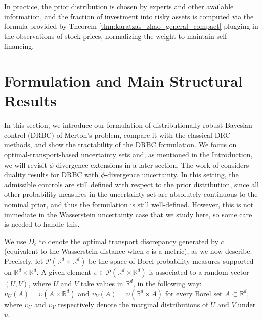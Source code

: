 \documentclass[11pt]{article}
\theoremstyle{definition}
\begin{document}
In practice, the prior distribution is chosen by experts and other available information, and the fraction of investment into risky assets is computed via the formula provided by Theorem \ref{thm:karatzas_zhao_general_compact} plugging in the observations of stock prices, normalizing the weight to maintain self-financing. %



\section{Formulation and Main Structural Results}\label{finmath}
In this section, we introduce our formulation of distributionally robust Bayesian control (DRBC) of Merton's problem, compare it with the classical DRC methods, and show the tractability of the DRBC formulation. We focus on optimal-transport-based uncertainty sets and, as mentioned in the Introduction, we will revisit $\phi$-divergence extensions in a later section. The work of \cite{Blanchet2025Duality} considers duality results for DRBC with $\phi$-divergence uncertainty. %
{In this setting, the admissible controls are still defined with respect to the prior distribution, since all other probability measures in the uncertainty set are absolutely continuous to the nominal prior, and thus the formulation is still well-defined.} 
However, this is not immediate in the Wasserstein uncertainty case that we study here, so some care is needed to handle this. %


We use $D_c$ to denote the optimal transport discrepancy generated by $c$ (equivalent to the Wasserstein distance when $c$ is a metric), as we now describe. Precisely, let
$\mathcal{P}(\mathbb{R}^{d}\times\mathbb{R}^{d})$ be the space of Borel
probability measures supported on $\mathbb{R}^{d}\times\mathbb{R}^{d}$. A
given element $\upsilon\in\mathcal{P}(\mathbb{R}^{d}\times\mathbb{R}^{d})$ is
associated to a random vector $\left(U,V\right)  $, where $U$ and $V$ take values in $\mathbb{R}^{d}$, in the following way: $\upsilon
_{U}\left(A\right) = \upsilon\left(  A\times\mathbb{R}^{d}\right)$ and $\upsilon
_{V}\left(  A\right) = \upsilon\left(  \mathbb{R}^{d}\times A\right)$ for every
Borel set $A\subset\mathbb{R}^{d}$, where $\upsilon_{U}$ and $\upsilon_{V}$ 
respectively denote the marginal distributions of $U$ and $V$ under $\upsilon$.
\end{document}
